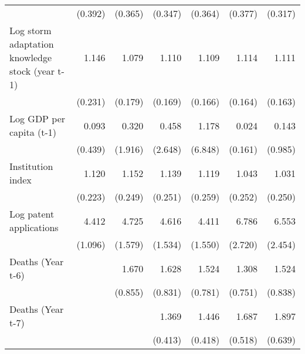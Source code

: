 \begin{table}[htbp]
\begin{tabular}{l*{6}{D{.}{.}{-1}}}
                    &     (0.392)         &     (0.365)         &     (0.347)         &     (0.364)         &     (0.377)         &     (0.317)         \\
\addlinespace
Log storm adaptation knowledge stock (year t-1)&       1.146         &       1.079         &       1.110         &       1.109         &       1.114         &       1.111         \\
                    &     (0.231)         &     (0.179)         &     (0.169)         &     (0.166)         &     (0.164)         &     (0.163)         \\
\addlinespace
Log GDP per capita (t-1)&       0.093         &       0.320         &       0.458         &       1.178         &       0.024         &       0.143         \\
                    &     (0.439)         &     (1.916)         &     (2.648)         &     (6.848)         &     (0.161)         &     (0.985)         \\
\addlinespace
Institution index   &       1.120         &       1.152         &       1.139         &       1.119         &       1.043         &       1.031         \\
                    &     (0.223)         &     (0.249)         &     (0.251)         &     (0.259)         &     (0.252)         &     (0.250)         \\
\addlinespace
Log patent applications&       4.412\sym{***}&       4.725\sym{***}&       4.616\sym{***}&       4.411\sym{***}&       6.786\sym{***}&       6.553\sym{***}\\
                    &     (1.096)         &     (1.579)         &     (1.534)         &     (1.550)         &     (2.720)         &     (2.454)         \\
\addlinespace
Deaths (Year t-6)   &                     &       1.670         &       1.628         &       1.524         &       1.308         &       1.524         \\
                    &                     &     (0.855)         &     (0.831)         &     (0.781)         &     (0.751)         &     (0.838)         \\
\addlinespace
Deaths (Year t-7)   &                     &                     &       1.369         &       1.446         &       1.687\sym{*}  &       1.897\sym{*}  \\
                    &                     &                     &     (0.413)         &     (0.418)         &     (0.518)         &     (0.639)         \\

\end{tabular}
\end{table}
